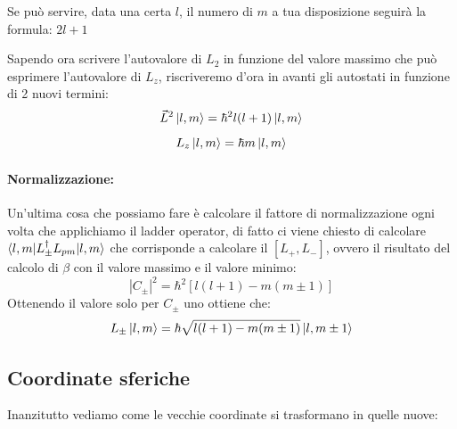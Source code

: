 \vspace{15pt}

\noindent Se può servire, data una certa $l$, il numero di $m$ a tua disposizione seguirà la formula: $2l + 1$

\vspace{15pt}

\noindent Sapendo ora scrivere l'autovalore di $L_2$ in funzione del valore massimo che può esprimere l'autovalore di $L_z$, riscriveremo d'ora in avanti gli autostati in funzione di 2 nuovi termini:
$$\vec{L}^2\ket{l, m} = \hbar^2 l(l+1)\ket{l, m}$$
$$L_z\ket{l, m} = \hbar m\ket{l, m}$$

\paragraph{Normalizzazione:}
Un'ultima cosa che possiamo fare è calcolare il fattore di normalizzazione ogni volta che applichiamo il ladder operator, di fatto ci viene chiesto di calcolare $\braket{l, m | L^{\dagger}_{\pm}L_{pm}|l, m}$ che corrisponde a calcolare il $[L_+, L_-]$, ovvero il risultato del calcolo di $\beta$ con il valore massimo e il valore minimo:
$$|C_{\pm}|^2 = \hbar^2[l(l+1) - m(m\pm 1)]$$
Ottenendo il valore solo per $C_{\pm}$ uno ottiene che:
$$L_{\pm}\ket{l, m} = \hbar\sqrt{l(l+1) - m(m\pm 1)}\ket{l, m\pm1}$$

\subsection{Coordinate sferiche}

Inanzitutto vediamo come le vecchie coordinate si trasformano in quelle nuove:


